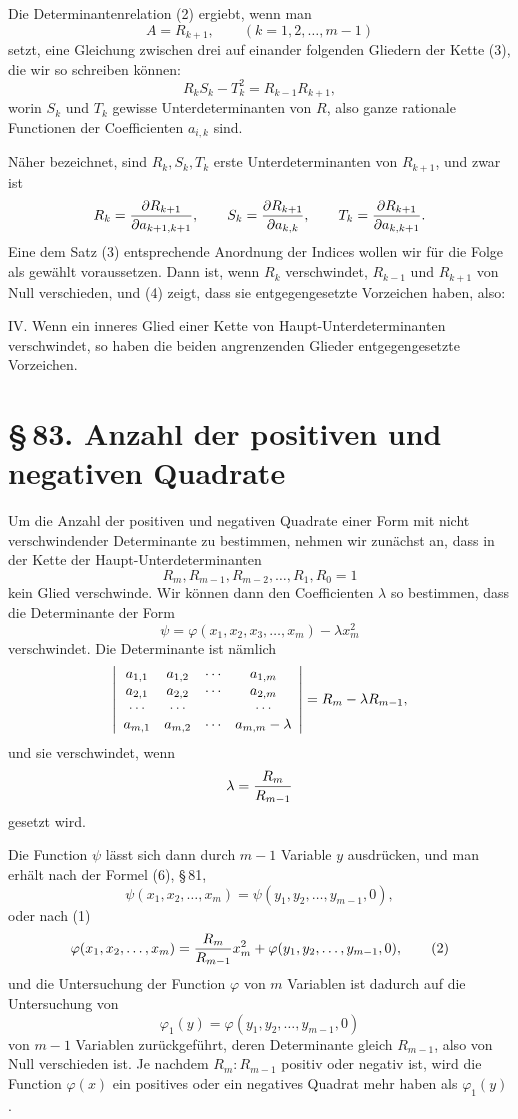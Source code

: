 \documentclass[11pt]{article}
\providecommand{\sect}[2]{\section*{\S\,#1. #2}}
\begin{document}
Die Determinantenrelation (2) ergiebt, wenn man
\[
        A=R_{k+1},\qquad (k=1,2,
\ldots,m-1)
\]
setzt, eine Gleichung zwischen drei auf einander folgenden Gliedern der Kette (3), die wir so schreiben k\"onnen:
\begin{equation}
        R_kS_k-T_k^2=R_{k-1}R_{k+1},
\tag{4}
\end{equation}
worin $S_k$ und $T_k$ gewisse Unterdeterminanten von $R$, also ganze rationale Functionen der Coefficienten $a_{i,k}$ sind.

N\"aher bezeichnet, sind $R_k,S_k,T_k$ erste Unterdeterminanten von $R_{k+1}$, und zwar ist
\[
        R_k={\partial R_{k+1}\over \partial a_{k+1,k+1}},
        \qquad
        S_k={\partial R_{k+1}\over \partial a_{k,k}},
        \qquad
        T_k={\partial R_{k+1}\over \partial a_{k,k+1}}.
\]
Eine dem Satz (3) entsprechende Anordnung der Indices wollen wir f\"ur die Folge als gew\"ahlt voraussetzen. Dann ist, wenn $R_k$ verschwindet, $R_{k-1}$ und $R_{k+1}$ von Null verschieden, und (4) zeigt, dass sie entgegengesetzte Vorzeichen haben, also:

IV. Wenn ein inneres Glied einer Kette von Haupt-Unterdeterminanten verschwindet, so haben die beiden angrenzenden Glieder entgegengesetzte Vorzeichen.

\sect{83}{Anzahl der positiven und negativen Quadrate}

Um die Anzahl der positiven und negativen Quadrate einer Form mit nicht verschwindender Determinante zu bestimmen, nehmen wir zun\"achst an, dass in der Kette der Haupt-Unterdeterminanten
\[
        R_m,
        R_{m-1},
        R_{m-2},
        \ldots,
        R_1,
        R_0=1
\]
kein Glied verschwinde. Wir k\"onnen dann den Coefficienten $\lambda$ so bestimmen, dass die Determinante der Form
\begin{equation}
        \psi=\varphi(x_1,x_2,x_3,
\ldots,x_m)-\lambda x_m^2
\tag{1}
\end{equation}
verschwindet. Die Determinante ist n\"amlich
\[
\left|\begin{array}{cccc}
 a_{1,1}&a_{1,2}&\cdots&a_{1,m}\cr
 a_{2,1}&a_{2,2}&\cdots&a_{2,m}\cr
 \cdots&\cdots&&\cdots\cr
 a_{m,1}&a_{m,2}&\cdots&a_{m,m}-\lambda
\end{array}\right|
      =R_m-\lambda R_{m-1},
\]
und sie verschwindet, wenn
\[
        \lambda={R_m\over R_{m-1}}
\]
gesetzt wird.

Die Function $\psi$ l\"asst sich dann durch $m-1$ Variable $y$ ausdr\"ucken, und man erh\"alt nach der Formel (6), \S\,81,
\[
        \psi(x_1,x_2,
\ldots,x_m)=\psi(y_1,y_2,
\ldots,y_{m-1},0),
\]
oder nach (1)
\begin{equation}
        \varphi(x_1,x_2,
\ldots,x_m)= {R_m\over R_{m-1}}x_m^2+
        \varphi(y_1,y_2,
\ldots,y_{m-1},0),
\tag{2}
\end{equation}
und die Untersuchung der Function $\varphi$ von $m$ Variablen ist dadurch auf die Untersuchung von
\[
        \varphi_1(y)=\varphi(y_1,y_2,
\ldots,y_{m-1},0)
\]
von $m-1$ Variablen zur\"uckgef\"uhrt, deren Determinante gleich $R_{m-1}$, also von Null verschieden ist. Je nachdem $R_m:R_{m-1}$ positiv oder negativ ist, wird die Function $\varphi(x)$ ein positives oder ein negatives Quadrat mehr haben als $\varphi_1(y)$.
\end{document}
